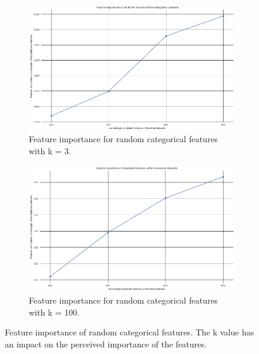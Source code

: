 \documentclass[a4paper,10pt]{article}
\begin{document}
\begin{figure}[H]
	\centering
	\begin{subfigure}[b]{0.45\textwidth}
		\includegraphics[width=\textwidth]{images/MetaFeatures/FeatureImportanceCat.png}
		\caption{Feature importance for random categorical features with k = 3.}
		\label{fig:FIC3}
	\end{subfigure}
	\begin{subfigure}[b]{0.45\textwidth}
		\includegraphics[width=\textwidth]{images/MetaFeatures/FeatureImportanceNum.png}
		\caption{Feature importance for random categorical features with k = 100.}
		\label{fig:FIC100}
	\end{subfigure}
	\caption{Feature importance of random categorical features. The k value has an impact on the perceived importance of the features.}\label{fig:FIC}
\end{figure}
\end{document}
